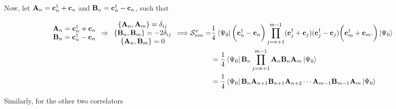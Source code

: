 \documentclass{homework}
\begin{document}
Now, let ${\bf A}_n = {\bf c}_n^\dagger + {\bf c}_n$ and ${\bf B}_n = {\bf c}_n^\dagger - {\bf c}_n$, such that 

\begin{equation} \begin{split}
    \begin{array}{c}
         {\bf A}_n = {\bf c}_n^\dagger + {\bf c}_n  \\
         {\bf B}_n = {\bf c}_n^\dagger - {\bf c}_n 
    \end{array} \Rightarrow \begin{array}{c}
         \{{\bf A}_n, {\bf A}_m\} = \delta_{ij} \\
         \{{\bf B}_n, {\bf B}_m\} = -2\delta_{ij} \\
         \{{\bf A}_n, {\bf B}_m\} = 0 
    \end{array} \Longrightarrow
    \mathcal{S}_{nm}^x =& \frac{1}{4} \bra{\Psi_0} \bigg({\bf c}_n^\dagger - {\bf c}_n\bigg) \prod_{j=n+1}^{m-1} ({\bf c}_j^\dagger + {\bf c}_j)({\bf c}_j^\dagger - {\bf c}_j) \bigg({\bf c}_m^\dagger + {\bf c}_m. \bigg)\ket{\Psi_0} \\
         &= \frac{1}{4} \bra{\Psi_0} {{\bf B}}_n \prod_{j=n+1}^{m-1} {{\bf A}}_n {{\bf B}}_n {{\bf A}}_m \ket{\Psi_0}    \\
         &= \frac{1}{4} \bra{\Psi_0} {{\bf B}}_n {{\bf A}}_{n+1} {{\bf B}}_{n+1} {{\bf A}}_{n+2} \cdots {{\bf A}}_{m-1} {{\bf B}}_{m-1} {{\bf A}}_m \ket{\Psi_0}
    \end{split} 
\end{equation}

Similarly, for the other two correlators 
\end{document}
